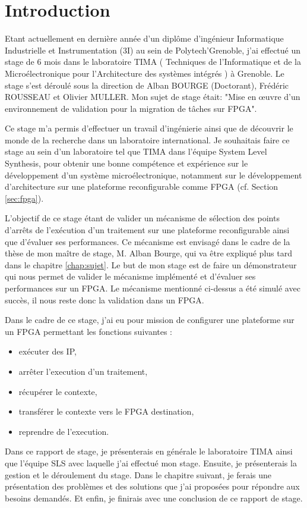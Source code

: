 \chapter{Introduction}
\label{chap:intro}
\OnehalfSpacing
\setlength{\parindent}{2em}
Etant actuellement en dernière année d'un diplôme d'ingénieur Informatique Industrielle et Instrumentation (3I) au sein de Polytech'Grenoble, 
j'ai effectué un stage de 6 mois dans le laboratoire TIMA ( Techniques de l'Informatique et de la Microélectronique 
pour l'Architecture des systèmes intégrés ) à Grenoble. 
Le stage s'est déroulé sous la direction de Alban BOURGE (Doctorant), Frédéric ROUSSEAU et Olivier MULLER. 
Mon sujet de stage était: "Mise en œuvre d'un environnement de validation pour la migration de tâches sur FPGA".

Ce stage m'a permis d'effectuer un travail d'ingénierie ainsi que de découvrir le monde de la recherche
dans un laboratoire international. Je souhaitais faire ce stage au sein d'un laboratoire tel que TIMA dans l'équipe System Level Synthesis, pour obtenir une bonne compétence et expérience sur le développement d'un système microélectronique, notamment sur le développement d'architecture sur une plateforme reconfigurable comme FPGA (cf. Section \ref{sec:fpga}). 

L'objectif de ce stage étant de valider un mécanisme de sélection des points d'arrêts de l'exécution d'un traitement sur une plateforme reconfigurable ainsi que d'évaluer ses performances. 
Ce mécanisme est envisagé dans le cadre de la thèse de mon maître de stage, M. Alban Bourge, qui va être expliqué plus tard dans le chapitre \ref{chap:sujet}. 
Le but de mon stage est de faire un démonstrateur qui nous permet de valider le mécanisme implémenté et d'évaluer ses performances sur un FPGA.
Le mécanisme mentionné ci-dessus a été simulé avec succès, il nous reste donc la validation dans un FPGA. 

Dans le cadre de ce stage, j'ai eu pour mission de configurer une plateforme sur un FPGA permettant les fonctions suivantes :
\begin{itemize}
\item exécuter des IP,
\item arrêter l'execution d'un traitement,
\item récupérer le contexte,
\item transférer le contexte vers le FPGA destination,
\item reprendre de l'execution.
\end{itemize}

Dans ce rapport de stage, je présenterais en générale le laboratoire TIMA ainsi que l'équipe SLS avec laquelle j'ai effectué mon stage. Ensuite, je présenterais la gestion et le déroulement du stage. Dans le chapitre suivant, je ferais une présentation des problèmes et des solutions que j'ai proposées pour répondre aux besoins demandés. Et enfin, je finirais avec une conclusion de ce rapport de stage.